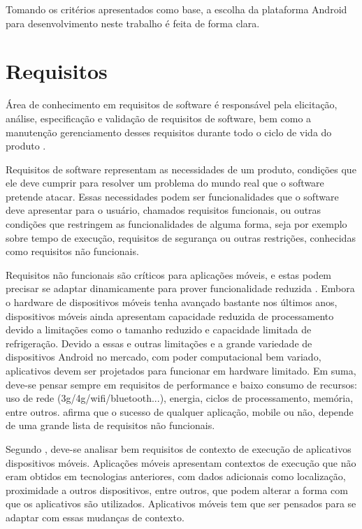 Tomando os critérios apresentados como base, a escolha da plataforma Android para desenvolvimento neste trabalho é feita de forma clara.

\section{Requisitos}

Área de conhecimento em requisitos de software é responsável pela elicitação, análise, especificação e validação de requisitos de software, bem como a manutenção gerenciamento desses requisitos durante todo o ciclo de vida do produto \cite{swebok}.

Requisitos de software representam as necessidades de um produto, condições que ele deve cumprir para resolver um problema do mundo real que o software pretende atacar. Essas necessidades podem ser funcionalidades que o software deve apresentar para o usuário, chamados requisitos funcionais, ou outras condições que restringem as funcionalidades de alguma forma, seja por exemplo sobre tempo de execução, requisitos de segurança ou outras restrições, conhecidas como requisitos não funcionais.

Requisitos não funcionais são críticos para aplicações móveis, e estas podem precisar se adaptar dinamicamente para prover funcionalidade reduzida \cite{eswmobile}. Embora o hardware de dispositivos móveis tenha avançado bastante nos últimos anos, dispositivos móveis ainda apresentam capacidade reduzida de processamento devido a limitações como o tamanho reduzido e capacidade limitada de refrigeração. Devido a essas e outras limitações e a grande variedade de dispositivos Android no mercado, com poder computacional bem variado, aplicativos devem ser projetados para funcionar em hardware limitado. Em suma, deve-se pensar sempre em requisitos de performance e baixo consumo de recursos: uso de rede (3g/4g/wifi/bluetooth...), energia, ciclos de processamento, memória, entre outros.  afirma que o sucesso de qualquer aplicação, mobile ou não, depende de uma grande lista de requisitos não funcionais.  

Segundo , deve-se analisar bem requisitos de contexto de execução de aplicativos dispositivos móveis. Aplicações móveis apresentam contextos de execução que não eram obtidos em tecnologias anteriores, com dados adicionais como localização, proximidade a outros dispositivos, entre outros, que podem alterar a forma com que os aplicativos são utilizados. Aplicativos móveis tem que ser pensados para se adaptar com essas mudanças de contexto.

